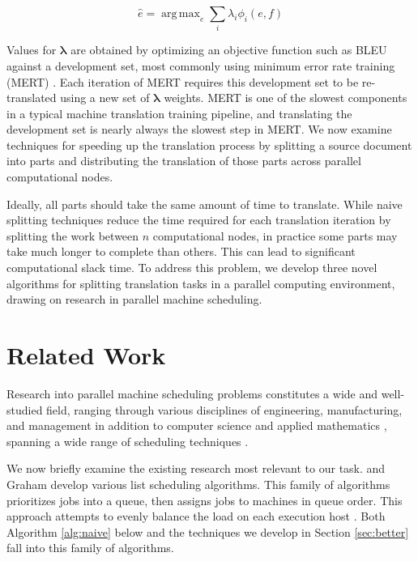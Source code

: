 \documentclass{pbml}
\DeclareMathOperator*{\argmax}{arg\,max}
\begin{document}
\begin{equation}
\hat{e} = \argmax_e \sum_i \lambda_i \phi_i(e,f)
\label{eq:smt}
\end{equation}


Values for $\bm{\lambda}$ are obtained by optimizing an objective function such as BLEU \citep{papinenietal01} against a development set, most commonly using minimum error rate training (MERT) \citep{och03}. Each iteration of MERT requires this development set to be re-translated using a new set of $\bm{\lambda}$ weights. MERT is one of the slowest components in a typical machine translation training pipeline, and translating the development set is nearly always the slowest step in MERT. We now examine techniques for speeding up the translation process by splitting a source document into parts and distributing the translation of those parts across parallel computational nodes. 

Ideally, all parts should take the same amount of time to translate. While naive splitting techniques reduce the time required for each translation iteration by splitting the work between $n$ computational nodes, in practice some parts may take much longer to complete than others. This can lead to significant computational slack time.
%
To address this problem, we develop three novel algorithms for splitting translation tasks in a parallel computing environment, drawing on research in parallel machine scheduling.





\section{Related Work}


Research into parallel machine scheduling problems constitutes a wide and well-studied field, ranging through various disciplines of engineering, manufacturing, and management in addition to computer science and applied mathematics \citep{ChengSin90}, 
spanning a wide range of scheduling techniques \citep{PanwalkarIskander77}.

We now briefly examine the existing research most relevant to our task. \citet{Hu61} and Graham \citeyearpar{Graham66,Graham69} develop various list scheduling algorithms. This family of algorithms prioritizes jobs into a queue, then assigns jobs to machines in queue order. This approach attempts to evenly balance the load on each execution host \citep{DeMorton80,ChengSin90}. 
Both Algorithm \ref{alg:naive} below and the techniques we develop in Section \ref{sec:better} fall into this family of algorithms.
\end{document}
